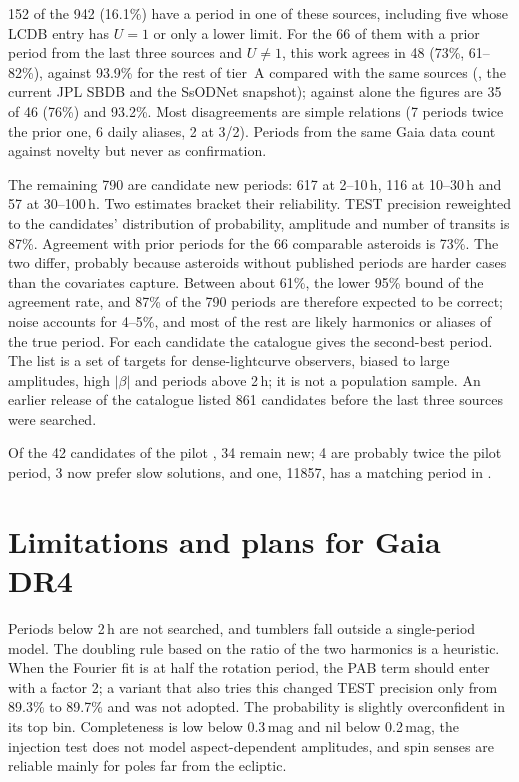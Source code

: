 152 of the 942 (16.1\%) have a period in one of these sources, including five whose LCDB entry has
$U=1$ or only a lower limit. For the 66 of them with a prior period from the last three sources and
$U\ne1$, this work agrees in 48 (73\%, 61--82\%), against 93.9\% for the rest of tier~A compared with the
same sources (\citet{Durech2022}, the current JPL SBDB and the SsODNet snapshot); against \citet{Durech2022} alone the figures are 35 of 46 (76\%) and 93.2\%. Most
disagreements are simple relations (7 periods twice the prior one, 6 daily aliases, 2 at 3/2). Periods from
the same Gaia data \citep{Durech2023,Cellino2024,MacLennan2026} count against novelty but never as
confirmation.

The remaining 790 are candidate new periods: 617 at 2--10\,h, 116 at 10--30\,h and 57 at 30--100\,h. Two
estimates bracket their reliability. TEST precision reweighted to the candidates' distribution of
probability, amplitude and number of transits is 87\%. Agreement with prior periods for the 66 comparable
asteroids is 73\%. The two differ, probably because asteroids without published periods are harder cases
than the covariates capture. Between about 61\%, the lower 95\% bound of the agreement rate, and 87\% of the 790 periods are therefore
expected to be correct; noise accounts for 4--5\%, and most of the rest are likely harmonics or aliases of the true period.
For each candidate the catalogue gives the second-best period. The list is a set of targets for
dense-lightcurve observers, biased to large amplitudes, high $|\beta|$ and periods above 2\,h; it is not a
population sample. An earlier release of the catalogue listed 861 candidates before the last three sources
were searched.

Of the 42 candidates of the pilot \citep{Tropynin2026a}, 34 remain new; 4 are probably twice the pilot
period, 3 now prefer slow solutions, and one, 11857, has a matching period in \citet{Durech2022}.

\section{Limitations and plans for Gaia DR4}

Periods below 2\,h are not searched, and tumblers fall outside a single-period model. The doubling rule
based on the ratio of the two harmonics is a heuristic. When the Fourier fit is at half the rotation
period, the PAB term should enter with a factor 2; a variant that also tries this changed TEST precision
only from 89.3\% to 89.7\% and was not adopted. The probability is slightly overconfident in its top bin.
Completeness is low below 0.3\,mag and nil below 0.2\,mag, the injection test does not model aspect-dependent
amplitudes, and spin senses are reliable mainly for poles far from the ecliptic.

